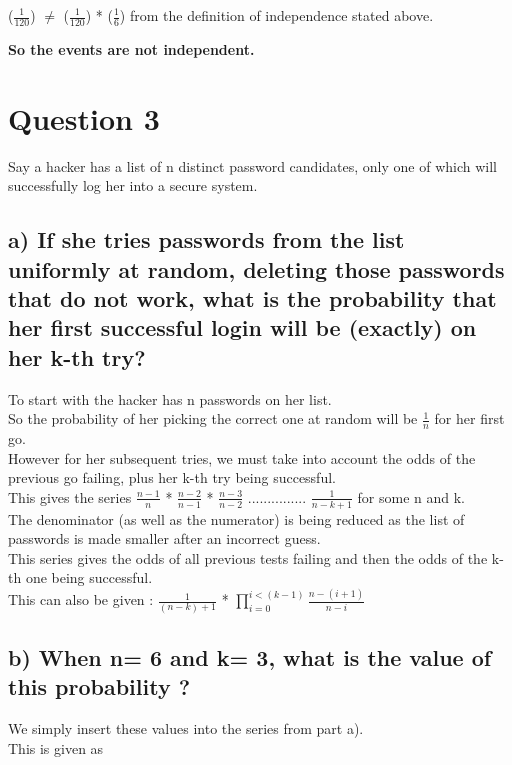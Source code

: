 \documentclass{report}
\begin{document}
	\begin{center}
		($\frac{1}{120}$) $\neq$ ($\frac{1}{120}$) * ($\frac{1}{6}$) from the definition of independence stated above.
	\end{center}

	\textbf{So the events are not independent.}














	\section*{\hfil Question 3 \hfil}
	Say a hacker has a list of n distinct password candidates, only one of which will successfully log her into a secure system.
		\subsection*{a) If she tries passwords from the list uniformly at random, deleting those passwords that do not work, what is the probability that her first 
		successful login will be (exactly) on her k-th try?}
			To start with the hacker has n passwords on her list.\\
			So the probability of her picking the correct one at random will be $\frac{1}{n}$ for her first go.\\
			However for her subsequent tries, we must take into account the odds of the previous go failing, plus her k-th try being successful.\\
			This gives the series $\frac{n-1}{n}$ * $\frac{n-2}{n-1}$ * $\frac{n-3}{n-2}$ ............... $\frac{1}{n-k+1}$ for some n and k.\\
			The denominator (as well as the numerator) is being reduced as the list of passwords is made smaller after an incorrect guess.\\
			This series gives the odds of all previous tests failing and then the odds of the k-th one being successful.\\
			This can also be given : $\frac{1}{(n-k)+1}$ * $\prod_{i=0}^{i<(k-1)} \frac{n-(i+1)}{n-i}$ \\
		
		\subsection*{b) When n= 6 and k= 3, what is the value of this probability ?}
			We simply insert these values into the series from part a).\\
			This is given as 
		
\end{document}
